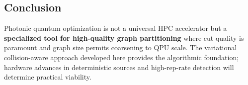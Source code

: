\subsection{Conclusion}

Photonic quantum optimization is not a universal HPC accelerator but a \textbf{specialized tool for high-quality graph partitioning} where cut quality is paramount and graph size permits coarsening to QPU scale. The variational collision-aware approach developed here provides the algorithmic foundation; hardware advances in deterministic sources and high-rep-rate detection will determine practical viability.

